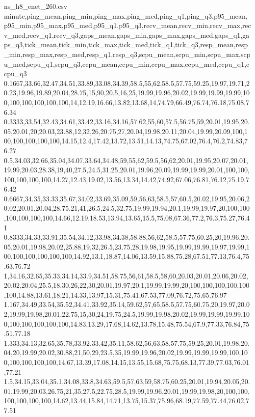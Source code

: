 \begin{filecontents*}[overwrite]{ns_h8_enet_260.csv}
minute,ping_mean,ping_min,ping_max,ping_med,ping_q1,ping_q3,p95_mean,p95_min,p95_max,p95_med,p95_q1,p95_q3,recv_mean,recv_min,recv_max,recv_med,recv_q1,recv_q3,gaps_mean,gaps_min,gaps_max,gaps_med,gaps_q1,gaps_q3,tick_mean,tick_min,tick_max,tick_med,tick_q1,tick_q3,resp_mean,resp_min,resp_max,resp_med,resp_q1,resp_q3,scpu_mean,scpu_min,scpu_max,scpu_med,scpu_q1,scpu_q3,ccpu_mean,ccpu_min,ccpu_max,ccpu_med,ccpu_q1,ccpu_q3
0.1667,33.66,32.47,34.51,33.89,33.08,34.39,58.5,55,62,58.5,57.75,59.25,19.97,19.71,20.23,19.96,19.89,20.04,28.75,15,90,20.5,16,25,19.99,19.96,20.02,19.99,19.99,19.99,100,100,100,100,100,100,14,12.19,16.66,13.82,13.68,14,74.79,66.49,76.74,76.18,75.08,76.34
0.3333,33.54,32.43,34.61,33.42,33.16,34.16,57.62,55,60,57.5,56.75,59,20.01,19.95,20.05,20.01,20,20.03,23.88,12,32,26,20.75,27,20.04,19.98,20.11,20.04,19.99,20.09,100,100,100,100,100,100,14.15,12.4,17.42,13.72,13.51,14.13,74.75,67.02,76.4,76.2,74.83,76.27
0.5,34.03,32.66,35.04,34.07,33.64,34.48,59,55,62,59.5,56,62,20.01,19.95,20.07,20.01,19.99,20.03,28.38,19,40,27.5,24.5,31.25,20.01,19.96,20.09,19.99,19.99,20.01,100,100,100,100,100,100,14.27,12.43,19.02,13.56,13.34,14.42,74.92,67.06,76.81,76.12,75.19,76.42
0.6667,34.35,33.33,35.67,34.02,33.69,35.09,59,56,63,58.5,57,60.5,20.02,19.95,20.06,20.02,20.01,20.04,28.75,21,41,26.5,24.5,32.75,19.99,19.94,20.1,19.99,19.97,20,100,100,100,100,100,100,14.66,12.19,18.53,13.94,13.65,15.5,75.08,67.36,77.2,76.3,75.27,76.41
0.8333,34.33,33.91,35.54,34.12,33.98,34.38,58.88,56,62,58.5,57.75,60.25,20,19.96,20.05,20.01,19.98,20.02,25.88,19,32,26.5,23.75,28,19.98,19.95,19.99,19.99,19.97,19.99,100,100,100,100,100,100,14.92,13.1,18.87,14.06,13.59,15.88,75.28,67.51,77.13,76.4,75.63,76.72
1,34.16,32.65,35.33,34.14,33.9,34.51,58.75,56,61,58.5,58,60,20.03,20.01,20.06,20.02,20.02,20.04,25.5,18,30,26,22,30,20.01,19.97,20.1,19.99,19.99,20,100,100,100,100,100,100,14.88,13.61,18.21,14.33,13.97,15.31,75.41,67.53,77.09,76.72,75.65,76.97
1.167,34.49,33.54,35.52,34.41,33.92,35.14,59.62,57,65,58.5,57.75,60.75,20,19.97,20.02,19.99,19.98,20.01,22.75,15,30,24,19.75,24.5,19.99,19.98,20.02,19.99,19.99,19.99,100,100,100,100,100,100,14.83,13.29,17.68,14.62,13.78,15.48,75.54,67.9,77.33,76.84,75.51,77.18
1.333,34.13,32.65,35.78,33.92,33.42,35.11,58.62,56,63,58,57.75,59.25,20.01,19.98,20.04,20,19.99,20.02,30.88,21,50,29,23.5,35,19.99,19.96,20.02,19.99,19.99,19.99,100,100,100,100,100,100,14.67,13.39,17.08,14.15,13.55,15.68,75.75,68.13,77.39,77.03,76.01,77.21
1.5,34.15,33.04,35.1,34.08,33.8,34.63,59.5,57,63,59,58.75,60.25,20.01,19.94,20.05,20.01,19.99,20.03,26.75,21,35,27.5,22.75,28.5,19.99,19.96,20.01,19.99,19.98,20,100,100,100,100,100,100,14.62,13.44,15.84,14.71,13.75,15.37,75.96,68.19,77.59,77.44,76.02,77.51

\end{filecontents*}
